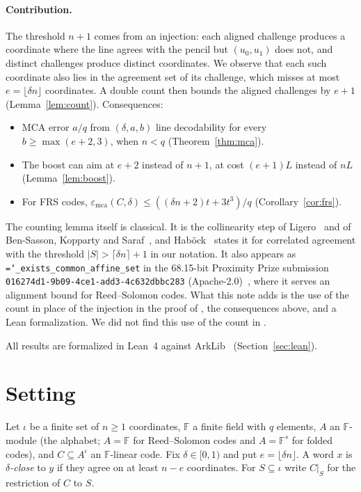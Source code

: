 \documentclass[11pt]{article}
\theoremstyle{definition}
\theoremstyle{remark}
\newcommand{\F}{\mathbb{F}}
\newcommand{\mca}{\varepsilon_{\mathrm{mca}}}
\newcommand{\lean}[1]{\texttt{\hyphenchar\font=`\_\relax #1}}
\begin{document}
\paragraph{Contribution.} The threshold $n+1$ comes from an injection: each aligned challenge
produces a coordinate where the line agrees with the pencil but $(u_0,u_1)$ does not, and distinct
challenges produce distinct coordinates. We observe that each such coordinate also lies in the
agreement set of its challenge, which misses at most $e=\lfloor\delta n\rfloor$ coordinates. A
double count then bounds the aligned challenges by $e+1$ (Lemma~\ref{lem:count}). Consequences:
\begin{itemize}
\item MCA error $a/q$ from $(\delta,a,b)$ line decodability for every $b\ge\max(e+2,3)$, when
$n<q$ (Theorem~\ref{thm:mca}).
\item The boost can aim at $e+2$ instead of $n+1$, at cost $(e+1)L$ instead of $nL$
(Lemma~\ref{lem:boost}).
\item For FRS codes, $\mca(C,\delta)\le((\delta n+2)t+3t^3)/q$
(Corollary~\ref{cor:frs}).
\end{itemize}
The counting lemma itself is classical. It is the collinearity step of Ligero~\cite{AHIV17} and of
Ben-Sasson, Kopparty and Saraf~\cite{BKS18}, and Hab\"ock~\cite[Lemma~1]{Hab25} states it for
correlated agreement with the threshold $|S|>\lceil\delta n\rceil+1$ in our notation. It also appears as
\lean{exists\_common\_affine\_set} in the 68.15-bit Proximity Prize submission
\texttt{016274d1-9b09-4ce1-add3-4c632dbbc283} (Apache-2.0)~\cite{BW}, where it serves an alignment
bound for Reed--Solomon codes. What this note adds is the use of the count in place of the
injection in the proof of \cite[Thm.~3.5]{GG25}, the consequences above, and a Lean
formalization. We did not find this use of the count in \cite{GG25,LCD26,AGG26}.

All results are formalized in Lean~4 against ArkLib~\cite{ArkLib} (Section~\ref{sec:lean}).

\section{Setting}

Let $\iota$ be a finite set of $n\ge1$ coordinates, $\F$ a finite field with $q$ elements, $A$ an
$\F$-module (the alphabet; $A=\F$ for Reed--Solomon codes and $A=\F^s$ for folded codes), and
$C\subseteq A^\iota$ an $\F$-linear code. Fix $\delta\in[0,1)$ and put $e=\lfloor\delta n\rfloor$.
A word $x$ is \emph{$\delta$-close} to $y$ if they agree on at least $n-e$ coordinates.
For $S\subseteq\iota$ write $C|_S$ for the restriction of $C$ to $S$.
\end{document}
